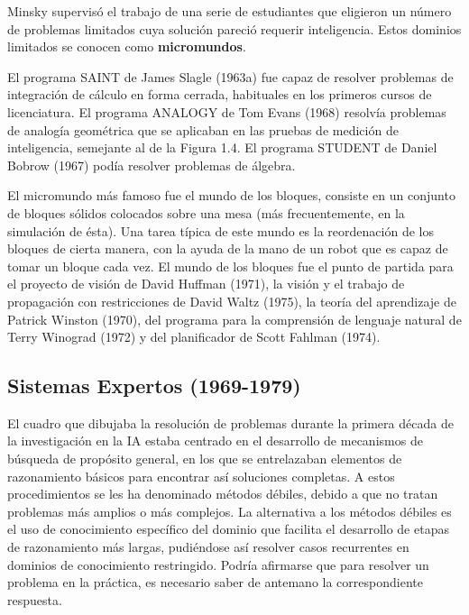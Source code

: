 \documentclass{article}
\begin{document}
Minsky supervisó el trabajo de una serie de estudiantes que eligieron un número de problemas limitados cuya solución pareció requerir inteligencia. Estos dominios limitados se conocen como \textbf{micromundos}.

 El programa SAINT de James Slagle (1963a) fue capaz de resolver problemas de integración de cálculo en forma cerrada, habituales en los primeros cursos de licenciatura. El programa ANALOGY de Tom Evans (1968) resolvía problemas de analogía geométrica que se aplicaban en las pruebas de medición de inteligencia, semejante al de la Figura 1.4. El programa STUDENT de Daniel Bobrow (1967) podía resolver problemas de álgebra.
 
 El micromundo más famoso fue el mundo de los bloques, consiste en un conjunto de bloques sólidos colocados sobre una mesa (más frecuentemente, en la simulación de ésta).  Una tarea típica de este mundo es la reordenación de los bloques de cierta manera, con la ayuda de la mano de un robot que es capaz de tomar un bloque cada vez. El mundo de los bloques fue el punto de partida para el proyecto de visión de David Huffman (1971), la visión y el trabajo de propagación con restricciones de David Waltz (1975), la teoría del aprendizaje de Patrick Winston (1970), del programa para la comprensión de lenguaje natural de Terry Winograd (1972) y del planificador de Scott Fahlman (1974). 

\subsection{Sistemas Expertos (1969-1979)}
El cuadro que dibujaba la resolución de problemas durante la primera década de la investigación en la IA estaba centrado en el desarrollo de mecanismos de búsqueda de propósito general, en los que se entrelazaban elementos de razonamiento básicos para encontrar así soluciones completas. A estos procedimientos se les ha denominado métodos débiles, debido a que no tratan problemas más amplios o más complejos. La alternativa a los métodos débiles es el uso de conocimiento específico del dominio que facilita el desarrollo de etapas de razonamiento más largas, pudiéndose así resolver casos recurrentes en dominios de conocimiento restringido. Podría afirmarse que para resolver un problema en la práctica, es necesario saber de antemano la correspondiente respuesta.  
\end{document}
